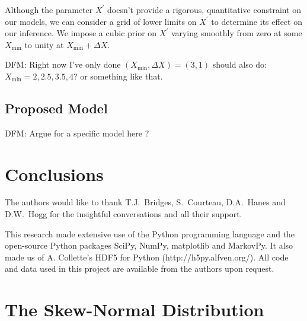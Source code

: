 \documentclass[preprint]{aastex}
\begin{document}
Although the parameter $X^\prime$ doesn't provide a rigorous, quantitative constraint on our models, we can consider a grid of lower limits on $X^\prime$ to determine its effect on our inference.  We impose a cubic prior on $X^\prime$ varying smoothly from zero at some $X_\mathrm{min}$ to unity at $X_\mathrm{min}+\Delta X$.

DFM: Right now I've only done $(X_\mathrm{min},\Delta X) = (3,1)$ should also do: $X_\mathrm{min} = 2,2.5,3.5,4$? or something like that.




\subsection{Proposed Model}

DFM: Argue for a specific model here ?



\section{Conclusions}





\acknowledgments The authors would like to thank T.J.~Bridges, S.~Courteau, D.A.~Hanes and
D.W.~Hogg for the insightful conversations and all their support.

This research made extensive use of the Python programming language and the
open-source Python packages SciPy, NumPy, matplotlib and MarkovPy.  It also
made us of A. Collette's HDF5 for Python (http://h5py.alfven.org/). All code
and data used in this project are available from the authors upon request.







\appendix

\section{The Skew-Normal Distribution}
\label{sect:sn}
\end{document}
